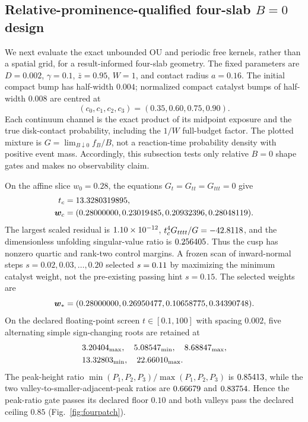 \documentclass[aps,physrev,reprint,amsmath,amssymb,longbibliography,floatfix]{revtex4-2}
\begin{document}
\subsection{Relative-prominence-qualified four-slab $B=0$ design}

We next evaluate the exact unbounded OU and periodic free kernels, rather than
a spatial grid, for a result-informed four-slab geometry.  The fixed
parameters are $D=0.002$, $\gamma=0.1$, $\bar z=0.95$, $W=1$, and contact
radius $a=0.16$.  The initial compact bump has half-width $0.004$; normalized
compact catalyst bumps of half-width $0.008$ are centred at
\begin{equation}
 (c_0,c_1,c_2,c_3)=(0.35,0.60,0.75,0.90).
\label{eq:fourcentres}
\end{equation}
Each continuum channel is the exact product of its midpoint exposure and the
true disk-contact probability, including the $1/W$ full-budget factor.
The plotted mixture is $G=\lim_{B\downarrow0}f_B/B$, not a reaction-time
probability density with positive event mass.  Accordingly, this subsection
tests only relative $B=0$ shape gates and makes no observability claim.

On the affine slice $w_0=0.28$, the equations
$G_t=G_{tt}=G_{ttt}=0$ give
\begin{align}
 t_c&=13.3280319895,\nonumber\\
 \bm w_c&=(0.28000000,0.23019485,0.20932396,0.28048119).
\label{eq:fourpatchcusp}
\end{align}
The largest scaled residual is $1.10\times10^{-12}$,
$t_c^4G_{tttt}/G=-42.8118$, and the dimensionless unfolding singular-value
ratio is $0.256405$.  Thus the cusp has nonzero quartic and rank-two control
margins.  A frozen scan of inward-normal steps
$s=0.02,0.03,\ldots,0.20$ selected $s=0.11$ by maximizing the minimum
catalyst weight, not the pre-existing passing hint $s=0.15$.  The selected
weights are
\begin{equation}
 \bm w_*=(0.28000000,0.26950477,0.10658775,0.34390748).
\label{eq:fourselected}
\end{equation}
On the declared floating-point screen $t\in[0.1,100]$ with spacing $0.002$,
five alternating simple sign-changing roots are retained at
\begin{equation}
\begin{aligned}
 &3.20404_{\rm max},\quad
 5.08547_{\rm min},\quad
 8.68847_{\rm max},\\
 &13.32803_{\rm min},\quad
 22.66010_{\rm max}.
\end{aligned}
\label{eq:fourroots}
\end{equation}
The peak-height ratio
$\min(P_1,P_2,P_3)/\max(P_1,P_2,P_3)$ is $0.85413$, while the two
valley-to-smaller-adjacent-peak ratios are $0.66679$ and
$0.83754$.  Hence the peak-ratio gate passes its declared floor
$0.10$ and both valleys pass the
declared ceiling $0.85$ (Fig.~\ref{fig:fourpatch}).
\end{document}
